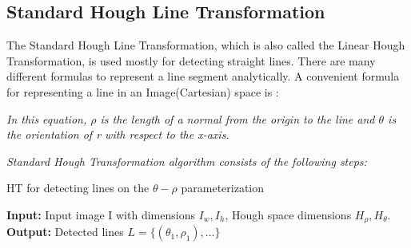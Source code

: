 \subsection{Standard Hough Line Transformation}\label{sec:Standard Hough Line Transformation}
%
The Standard Hough Line Transformation, which is also called the Linear Hough Transformation, is used mostly for detecting straight lines. There are many different formulas to represent a line segment analytically. A convenient formula for representing a line in an Image(Cartesian) space is :

  \begin{center}


  \end{center}
  
\emph{\color{green}In this equation, \textit{$ \rho $} is the length of a normal from the origin to the line and \textit{$ \theta $} is the orientation of \textit{r} with respect to the x-axis.}
 

 
\emph{\color{green}Standard Hough Transformation algorithm consists of the following steps:}
 
\begin{algorithm}[h]

 \caption{ HT for detecting lines on the $\theta - \rho$ parameterization}
\begin{algorithmic}[1]
        \newline
        \textbf{Input: }Input image I with dimensions $I_{w},I_{h}$, Hough space dimensions $H_{\rho},H_{\theta}$.\newline
        \textbf{Output:} Detected lines $L=\lbrace(\theta_{1},\rho_{1}),...\rbrace$ 
         \EndIf
         \EndFor
        
        \EndProcedure
 \end{algorithmic}    
 \end{algorithm}
 
